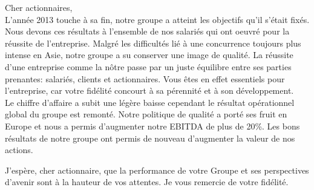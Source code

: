 
Cher actionnaires,\\

	 L'année 2013 touche à sa fin, notre groupe a atteint les objectifs qu'il s'était fixés.
	 Nous devons ces résultats à l'ensemble de nos salariés qui ont oeuvré pour la réussite de l'entreprise.
	 Malgré les difficultés lié à une concurrence toujours plus intense en Asie, notre groupe a su conserver une image de qualité.
	 La réussite d'une entreprise comme la nôtre passe par un juste équilibre entre ses parties prenantes: salariés, clients et actionnaires.
	 Vous êtes en effet essentiels pour l’entreprise, car votre fidélité concourt à sa pérennité et à son développement. \\

	 Le chiffre d'affaire a subit une légère baisse cependant le résultat opérationnel global du groupe est remonté.
	 Notre politique de qualité a porté ses fruit en Europe et nous a permis d'augmenter notre EBITDA de plus de 20\%.
	 Les bons résultats de notre groupe ont permis de nouveau d'augmenter la valeur de nos actions.

	 J’espère, cher actionnaire, que la performance de votre Groupe et ses perspectives d’avenir sont à la hauteur de vos attentes.
	 Je vous remercie de votre fidélité.
